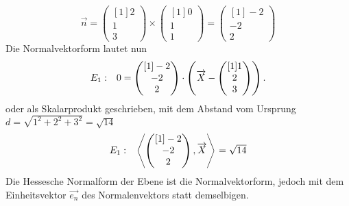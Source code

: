 \begin{equation*}
	\vec{n} =\begin{pmatrix}[1]
		2\\
		1\\
		3
	\end{pmatrix} \times \begin{pmatrix}[1]
		0\\
		1\\
		1
	\end{pmatrix} =\begin{pmatrix}[1]
		-2\\
		-2\\
		2
	\end{pmatrix}
\end{equation*}
Die Normalvektorform lautet nun
\begin{equation*}
	\begin{array}{ r l }
		E_{1} : & 0=\begin{pmatrix}[1]
			-2\\
			-2\\
			2
		\end{pmatrix} \cdotp \left(\vec{X} -\begin{pmatrix}[1]
			1\\
			2\\
			3
		\end{pmatrix}\right)\text{.}
	\end{array}
\end{equation*}
oder als Skalarprodukt geschrieben, mit dem Abstand vom Ursprung $\displaystyle d=\sqrt{1^{2} +2^{2} +3^{2}} =\sqrt{14}$
\begin{equation*}
	\begin{array}{ r l }
		E_{1} : & \left< \begin{pmatrix}[1]
			-2\\
			-2\\
			2
		\end{pmatrix} ,\vec{X}\right> =\sqrt{14}
	\end{array}
\end{equation*}
Die Hessesche Normalform der Ebene ist die Normalvektorform, jedoch mit dem Einheitsvektor $\displaystyle \overrightarrow{e_{n}}$ des Normalenvektors statt demselbigen.

